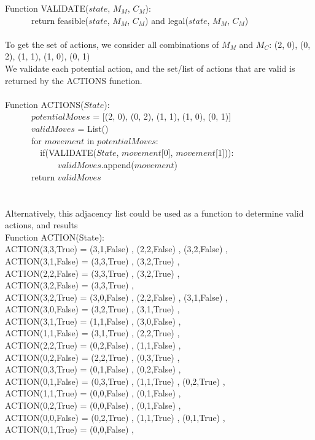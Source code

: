 \documentclass{article}
\begin{document}
\verb||Function VALIDATE($state$, $M_M$, $C_M$):\\
\verb|      |return feasible($state$, $M_M$, $C_M$) and legal($state$, $M_M$, $C_M$)\\\\



To get the set of actions, we consider all combinations of $M_M$ and $M_C$: (2, 0), (0, 2), (1, 1), (1, 0), (0, 1)\\
We validate each potential action, and the set/list of actions that are valid is returned by the ACTIONS function.\\\\
\verb||Function ACTIONS($State$):\\
\verb|      |$potentialMoves$ = [(2, 0), (0, 2), (1, 1), (1, 0), (0, 1)]\\
\verb|      |$validMoves$ = List()\\
\verb|      |for $movement$ in $potentialMoves$:\\
\verb|        |if(VALIDATE($State$, $movement$[0], $movement$[1])):\\
\verb|            |$validMoves$.append($movement$)\\
\verb|      |return $validMoves$\\
\\
\\
Alternatively, this adjacency list could be used as a function to determine valid actions, and results\\
Function ACTION(State):\\
ACTION(3,3,True) = {(3,1,False)} , {(2,2,False)} , {(3,2,False)} ,\\
ACTION(3,1,False) = {(3,3,True)} , {(3,2,True)} ,\\
ACTION(2,2,False) = {(3,3,True)} , {(3,2,True)} ,\\
ACTION(3,2,False) = {(3,3,True)} ,\\
ACTION(3,2,True) = {(3,0,False)} , {(2,2,False)} , {(3,1,False)} ,\\
ACTION(3,0,False) = {(3,2,True)} , {(3,1,True)} ,\\
ACTION(3,1,True) = {(1,1,False)} , {(3,0,False)} ,\\
ACTION(1,1,False) = {(3,1,True)} , {(2,2,True)} ,\\
ACTION(2,2,True) = {(0,2,False)} , {(1,1,False)} ,\\
ACTION(0,2,False) = {(2,2,True)} , {(0,3,True)} ,\\
ACTION(0,3,True) = {(0,1,False)} , {(0,2,False)} ,\\
ACTION(0,1,False) = {(0,3,True)} , {(1,1,True)} , {(0,2,True)} ,\\
ACTION(1,1,True) = {(0,0,False)} , {(0,1,False)} ,\\
ACTION(0,2,True) = {(0,0,False)} , {(0,1,False)} ,\\
ACTION(0,0,False) = {(0,2,True)} , {(1,1,True)} , {(0,1,True)} ,\\
ACTION(0,1,True) = {(0,0,False)} ,\\
    
\end{document}
